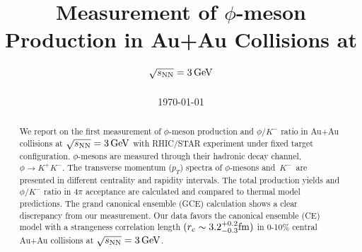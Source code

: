 \documentclass[%
 reprint,	
showpacs,
 amsmath,amssymb,
 aps,
 prc,
]{revtex4-1}
\begin{document}

\title{Measurement of $\phi$-meson Production in Au+Au Collisions at ${\sqrt{s_{\rm NN}} = \rm{3\,GeV}}$}%


\noaffiliation

\date{\today}%

\begin{abstract}


We report on the first measurement of $\phi$-meson production and $\phi/K^-$ ratio in Au+Au collisions at ${\sqrt{s_{\rm NN}} = \rm{3\,GeV}}$ with RHIC/STAR experiment under fixed target configuration. $\phi$-mesons are measured through their hadronic decay channel, $\phi\rightarrow K^+K^-$. The transverse momentum ($p_T$) spectra of $\phi$-mesons and $K^-$ are presented in different centrality and rapidity intervals. The total production yields and $\phi/K^-$ ratio in $4\pi$ acceptance are calculated and compared to thermal model predictions. The grand canonical ensemble (GCE) calculation shows a clear discrepancy from our measurement. Our data favors the canonical ensemble (CE) model with a strangeness correlation length $(r_c   \sim 3.2_{-0.3}^{+0.2} \rm{fm})$ in 0-10\% central Au+Au collisions at ${\sqrt{s_{\rm NN}} = \rm{3\,GeV}}$.


\end{abstract}
\end{document}
